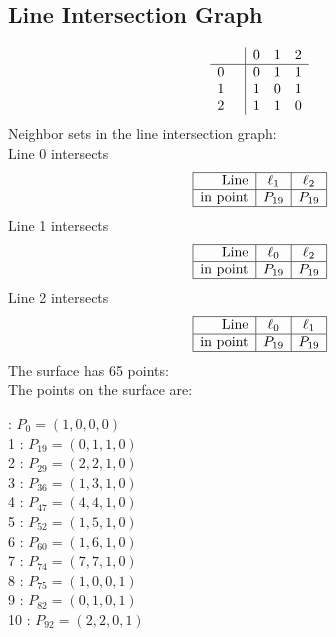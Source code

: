 \documentclass{article}
\begin{document}
{\subsection*{Line Intersection Graph}
{\arraycolsep=1pt
$$
\begin{array}{rr|*{3}r}
 &  & 0 & 1 & 2\\
\hline
0 &  & 0 & 1 & 1\\
1 &  & 1 & 0 & 1\\
2 &  & 1 & 1 & 0\\
\end{array}
$$
}%
Neighbor sets in the line intersection graph:\\
Line 0 intersects 
$$
\begin{array}{|r*{2}{|c}|}
\hline
\mbox{Line}  & \ell_{1} & \ell_{2}\\
\hline
\mbox{in point}  & P_{19} & P_{19}\\
\hline
\end{array}
$$
Line 1 intersects 
$$
\begin{array}{|r*{2}{|c}|}
\hline
\mbox{Line}  & \ell_{0} & \ell_{2}\\
\hline
\mbox{in point}  & P_{19} & P_{19}\\
\hline
\end{array}
$$
Line 2 intersects 
$$
\begin{array}{|r*{2}{|c}|}
\hline
\mbox{Line}  & \ell_{0} & \ell_{1}\\
\hline
\mbox{in point}  & P_{19} & P_{19}\\
\hline
\end{array}
$$
The surface has 65 points:\\
The points on the surface are:\\
\begin{multicols}{3}
 : $P_{0}=( 1, 0, 0, 0 )$\\
1 : $P_{19}=( 0, 1, 1, 0 )$\\
2 : $P_{29}=( 2, 2, 1, 0 )$\\
3 : $P_{36}=( 1, 3, 1, 0 )$\\
4 : $P_{47}=( 4, 4, 1, 0 )$\\
5 : $P_{52}=( 1, 5, 1, 0 )$\\
6 : $P_{60}=( 1, 6, 1, 0 )$\\
7 : $P_{74}=( 7, 7, 1, 0 )$\\
8 : $P_{75}=( 1, 0, 0, 1 )$\\
9 : $P_{82}=( 0, 1, 0, 1 )$\\
10 : $P_{92}=( 2, 2, 0, 1 )$\\

\end{multicols}}
\end{document}
